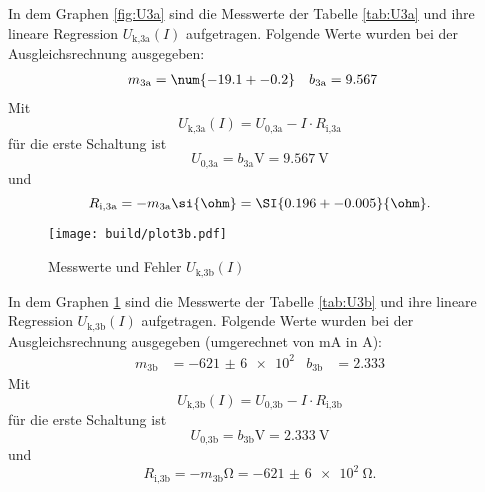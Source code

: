   In dem Graphen \ref{fig:U3a} sind die Messwerte der Tabelle
  \ref{tab:U3a} und ihre lineare Regression
  $U_\text{k,3a}(I)$ aufgetragen.
  Folgende Werte wurden bei der Ausgleichsrechnung ausgegeben:
  \begin{align}
    m_\text{3a} & = \num{-19.1 +- 0.2} & b_\text{3a} & = 9.567
  \end{align}
  Mit
  \begin{equation}
    U_\text{k,3a}(I) = U_\text{0,3a} - I \cdot R_\text{i,3a}
  \end{equation}
  für die erste Schaltung ist
  \begin{equation}
    U_\text{0,3a} = b_\text{3a} \si{\V} = \SI{9.567}{\V}
  \end{equation}
  und
  \begin{equation}
    R_\text{i,3a} = -m_\text{3a} \si{\ohm} = \SI{0.196 +- 0.005}{\ohm}.
  \end{equation}

  \newpage

  \begin{figure}[h]
    \texttt{[image: build/plot3b.pdf]}
    \caption{Messwerte und Fehler $U_\text{k,3b}(I)$}
    \label{fig:U3b}
  \end{figure}

  In dem Graphen \ref{fig:U3b} sind die Messwerte der Tabelle
  \ref{tab:U3b} und ihre lineare Regression
  $U_\text{k,3b}(I)$ aufgetragen.
  Folgende Werte wurden bei der Ausgleichsrechnung ausgegeben (umgerechnet von
  \si{\milli\A} in \si{\A}):
  \begin{align}
    m_\text{3b} & = \num{-621(6)e2} & b_\text{3b} & = 2.333
  \end{align}
  Mit
  \begin{equation}
    U_\text{k,3b}(I) = U_\text{0,3b} - I \cdot R_\text{i,3b}
  \end{equation}
  für die erste Schaltung ist
  \begin{equation}
    U_\text{0,3b} = b_\text{3b} \si{\V} = \SI{2.333}{\V}
  \end{equation}
  und
  \begin{equation}
    R_\text{i,3b} = -m_\text{3b} \si{\ohm} = \SI{-621(6)e2}{\ohm}.
  \end{equation}

  \newpage

